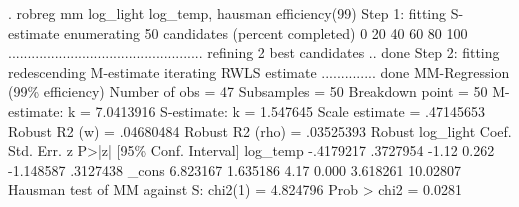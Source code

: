 . robreg mm log_light log_temp, hausman efficiency(99)
{\smallskip}
Step 1: fitting S-estimate
{\smallskip}
enumerating 50 candidates (percent completed)
0  20  40  60  80  100
..................................................
{\smallskip}
refining 2 best candidates .. done
{\smallskip}
Step 2: fitting redescending M-estimate
{\smallskip}
iterating RWLS estimate .............. done
{\smallskip}
MM-Regression (99\% efficiency)                  Number of obs     =         47
                                                  Subsamples      =         50
                                                  Breakdown point =         50
                                                  M-estimate: k   =  7.0413916
                                                  S-estimate: k   =   1.547645
                                                  Scale estimate  =  .47145653
                                                  Robust R2 (w)   =  .04680484
                                                  Robust R2 (rho) =  .03525393
{\smallskip}
             {\VBAR}               Robust
   log_light {\VBAR}      Coef.   Std. Err.      z    P>|z|     [95\% Conf. Interval]
    log_temp {\VBAR}  -.4179217   .3727954    -1.12   0.262    -1.148587    .3127438
       _cons {\VBAR}   6.823167   1.635186     4.17   0.000     3.618261    10.02807
Hausman test of MM against S:    chi2(1) =  4.824796      Prob > chi2 = 0.0281
{\smallskip}
